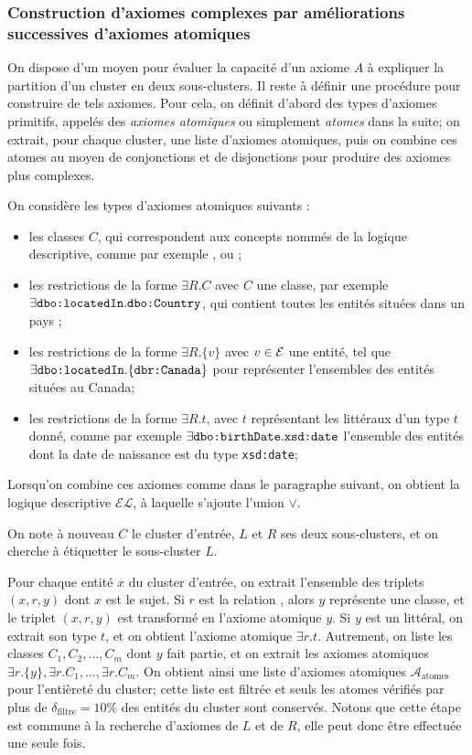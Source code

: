 \subsubsection{Construction d'axiomes complexes par améliorations successives d'axiomes atomiques}

On dispose d'un moyen pour évaluer la capacité d'un axiome $A$ à expliquer la partition d'un cluster en deux sous-clusters. Il reste à définir une procédure pour construire de tels axiomes. Pour cela, on définit d'abord des types d'axiomes primitifs, appelés des \textit{axiomes atomiques} ou simplement \textit{atomes} dans la suite; on extrait, pour chaque cluster, une liste d'axiomes atomiques, puis on combine ces atomes au moyen de conjonctions et de disjonctions pour produire des axiomes plus complexes.

On considère les types d'axiomes atomiques suivants :
\begin{itemize}
    \item les classes $C$, qui correspondent aux concepts nommés de la logique descriptive, comme par exemple ,  ou ;
    \item les restrictions de la forme $\exists R.C$ avec $C$ une classe, par exemple $\exists \texttt{dbo:locatedIn}.\texttt{dbo:Country}$, qui contient toutes les entités situées dans un pays ;
    \item les restrictions de la forme $\exists R.\{v\}$ avec $v \in \mathcal{E}$ une entité, tel que $\exists \texttt{dbo:locatedIn}.\{\texttt{dbr:Canada}\}$ pour représenter l'ensembles des entités situées au Canada;
    \item les restrictions de la forme $\exists R.t$, avec $t$ représentant les littéraux d'un type $t$ donné, comme par exemple $\exists \texttt{dbo:birthDate}.\texttt{xsd:date}$ l'ensemble des entités dont la date de naissance est du type \texttt{xsd:date};
\end{itemize}
Lorsqu'on combine ces axiomes comme dans le paragraphe suivant, on obtient la logique descriptive $\mathcal{EL}$, à laquelle s'ajoute l'union $\lor$.

On note à nouveau $C$ le cluster d'entrée,  $L$ et $R$ ses deux sous-clusters, et on cherche à étiquetter le sous-cluster $L$.

Pour chaque entité $x$ du cluster d'entrée, on extrait l'ensemble des triplets $(x, r, y)$ dont $x$ est le sujet. Si $r$ est la relation , alors $y$ représente une classe, et le triplet $(x, r, y)$ est transformé en l'axiome atomique $y$. Si $y$ est un littéral, on extrait son type $t$, et on obtient l'axiome atomique $\exists r.t$. Autrement, on liste les classes $C_1, C_2, \ldots, C_m$ dont $y$ fait partie, et on extrait les axiomes atomiques $\exists r.\{y\}, \exists r.C_1, \ldots, \exists r.C_m$. On obtient ainsi une liste d'axiomes atomiques $\mathcal{A}_\text{atomes}$ pour l'entièreté du cluster; cette liste est filtrée et seuls les atomes vérifiés par plus de $\delta_\text{filtre} = 10\%$ des entités du cluster sont conservés. Notons que cette étape est commune à la recherche d'axiomes de $L$ et de $R$, elle peut donc être effectuée une seule fois.

